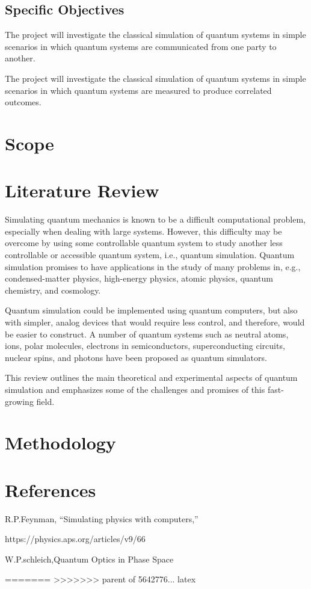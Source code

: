\documentclass[options]{article}
\begin{document}
\subsection{Specific Objectives}
The project will investigate the classical simulation of quantum systems in simple scenarios in which quantum systems are communicated from one party to another. 

The project will investigate the classical simulation of quantum systems in simple scenarios in which quantum systems are measured to produce correlated outcomes. 

\section {\textbf{Scope}}

\section{\textbf{Literature Review }}
Simulating quantum mechanics is known to be a difficult computational problem, especially when dealing with large systems. However, this difficulty may be overcome by using some controllable quantum system to study another less controllable or accessible quantum system, i.e., quantum simulation. Quantum simulation promises to have applications in the study of many problems in, e.g., condensed-matter physics, high-energy physics, atomic physics, quantum chemistry, and cosmology. 

Quantum simulation could be implemented using quantum computers, but also with simpler, analog devices that would require less control, and therefore, would be easier to construct. A number of quantum systems such as neutral atoms, ions, polar molecules, electrons in semiconductors, superconducting circuits, nuclear spins, and photons have been proposed as quantum simulators. 

This review outlines the main theoretical and experimental aspects of quantum simulation and emphasizes some of the challenges and promises of this fast-growing field.


\section {\textbf{Methodology}}

\section{\textbf{References}}
R.P.Feynman, “Simulating physics with computers,”

https://physics.aps.org/articles/v9/66 

W.P.schleich,Quantum Optics in Phase Space 



=======
>>>>>>> parent of 5642776... latex
\end{document}

